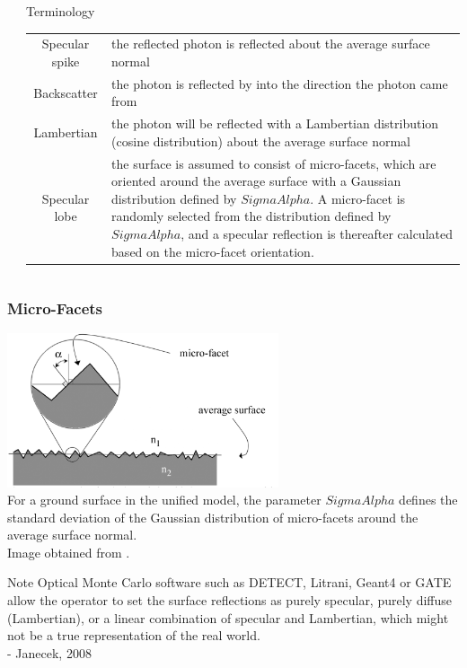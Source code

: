 \documentclass[xcolor=x11names, compress, handout]{beamer}
\renewcommand{\(}{\begin{columns}}
\renewcommand{\)}{\end{columns}}
\newcommand{\<}[1]{\begin{column}{#1}}
\renewcommand{\>}{\end{column}}
\begin{document}
\begin{frame}
\begin{columns}
\begin{column}{0.4\textwidth}
\end{column}
\begin{column}{0.6\textwidth}
\scriptsize
\begin{block}{Terminology \cite{janecek_moses_2010}}
\begin{tabular}{c p{4.5cm}}
Specular spike & the reflected photon is reflected about the average surface normal \\
Backscatter & the photon is reflected by into the direction the photon came from \\
Lambertian & the photon will be reflected with a Lambertian distribution (cosine distribution) about the average surface normal \\
Specular lobe & the surface is assumed to consist of micro-facets, which are oriented around the average surface with a Gaussian distribution defined by $SigmaAlpha$. A micro-facet is randomly selected from the distribution defined by $SigmaAlpha$, and a specular reflection is thereafter calculated based on the micro-facet orientation. 
\end{tabular}
\end{block}
\end{column}
\end{columns}
\end{frame}

\begin{frame}
\frametitle{Micro-Facets}
\centering
\includegraphics[width=0.6\textwidth]{images/microfacets.png}
\scriptsize \\
For a ground surface in the unified model, the parameter $SigmaAlpha$ defines the standard deviation of the Gaussian distribution of micro-facets around the average surface normal. \\ Image obtained from \cite{janecek_moses_2010}.

\begin{block}{Note}
Optical Monte Carlo software such as DETECT, Litrani, Geant4 or GATE allow the operator to set the surface reflections as purely specular, purely diffuse (Lambertian), or a linear combination of specular and Lambertian, which might not be a true representation of the real world. \cite{janecek_moses_2008}\\
\hfill  - Janecek, 2008
\end{block}
\end{frame}
\end{document}
